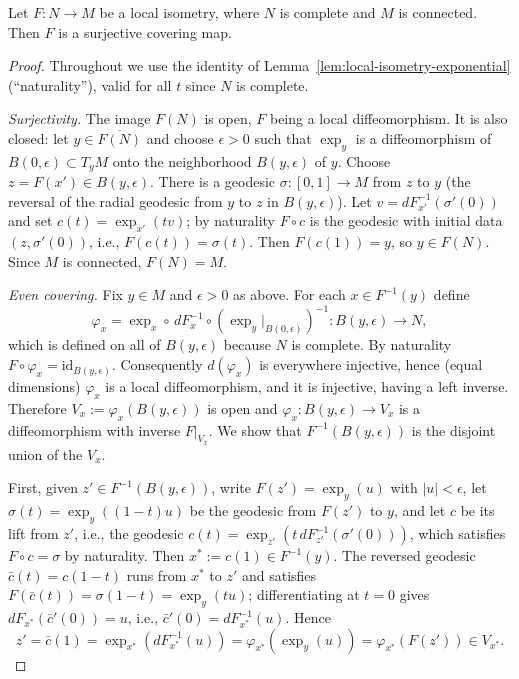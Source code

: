 \begin{lemma}
\label{lem:local-isometry-covering}
Let $F\colon N\to M$ be a local isometry, where $N$ is complete and
$M$ is connected. Then $F$ is a surjective covering map.
\end{lemma}

\begin{proof}
Throughout we use the identity of
Lemma~\ref{lem:local-isometry-exponential} (``naturality''), valid
for all $t$ since $N$ is complete.

\emph{Surjectivity.} The image $F(N)$ is open, $F$ being a local
diffeomorphism. It is also closed: let $y\in\overline{F(N)}$ and
choose $\epsilon>0$ such that $\exp_y$ is a diffeomorphism of
$B(0,\epsilon)\subset T_yM$ onto the neighborhood $B(y,\epsilon)$
of $y$. Choose $z=F(x')\in B(y,\epsilon)$. There is a geodesic
$\sigma\colon [0,1]\to M$ from $z$ to $y$ (the reversal of the
radial geodesic from $y$ to $z$ in $B(y,\epsilon)$). Let
$v=d F_{x'}^{-1}\left(\sigma'(0)\right)$ and set
$c(t)=\exp_{x'}(tv)$; by naturality $F\circ c$ is the geodesic with
initial data $(z,\sigma'(0))$, i.e., $F(c(t))=\sigma(t)$. Then
$F(c(1))=y$, so $y\in F(N)$. Since $M$ is connected, $F(N)=M$.

\emph{Even covering.} Fix $y\in M$ and $\epsilon>0$ as above. For
each $x\in F^{-1}(y)$ define
$$\varphi_x=\exp_x\circ\, dF_x^{-1}\circ
\left(\exp_y|_{B(0,\epsilon)}\right)^{-1}
\colon B(y,\epsilon)\longrightarrow N,$$
which is defined on all of $B(y,\epsilon)$ because $N$ is complete.
By naturality $F\circ\varphi_x=\mathrm{id}_{B(y,\epsilon)}$.
Consequently $d(\varphi_x)$ is everywhere injective, hence (equal
dimensions) $\varphi_x$ is a local diffeomorphism, and it is
injective, having a left inverse. Therefore
$V_x:=\varphi_x(B(y,\epsilon))$ is open and $\varphi_x\colon
B(y,\epsilon)\to V_x$ is a diffeomorphism with inverse $F|_{V_x}$.
We show that $F^{-1}(B(y,\epsilon))$ is the disjoint union of the
$V_x$.

First, given $z'\in F^{-1}(B(y,\epsilon))$, write
$F(z')=\exp_y(u)$ with $|u|<\epsilon$, let $\sigma(t)=\exp_y((1-t)u)$
be the geodesic from $F(z')$ to $y$, and let $c$ be its lift from
$z'$, i.e., the geodesic $c(t)=\exp_{z'}\left(t\,
dF_{z'}^{-1}(\sigma'(0))\right)$, which satisfies $F\circ c=\sigma$
by naturality. Then $x^*:=c(1)\in F^{-1}(y)$. The reversed geodesic
$\bar c(t)=c(1-t)$ runs from $x^*$ to $z'$ and satisfies $F(\bar
c(t))=\sigma(1-t)=\exp_y(tu)$; differentiating at $t=0$ gives
$dF_{x^*}(\bar c'(0))=u$, i.e., $\bar c'(0)=dF_{x^*}^{-1}(u)$.
Hence
$$z'=\bar c(1)=\exp_{x^*}\left(dF_{x^*}^{-1}(u)\right)
=\varphi_{x^*}\left(\exp_y(u)\right)=\varphi_{x^*}(F(z'))\in
V_{x^*}.$$


\end{proof}
